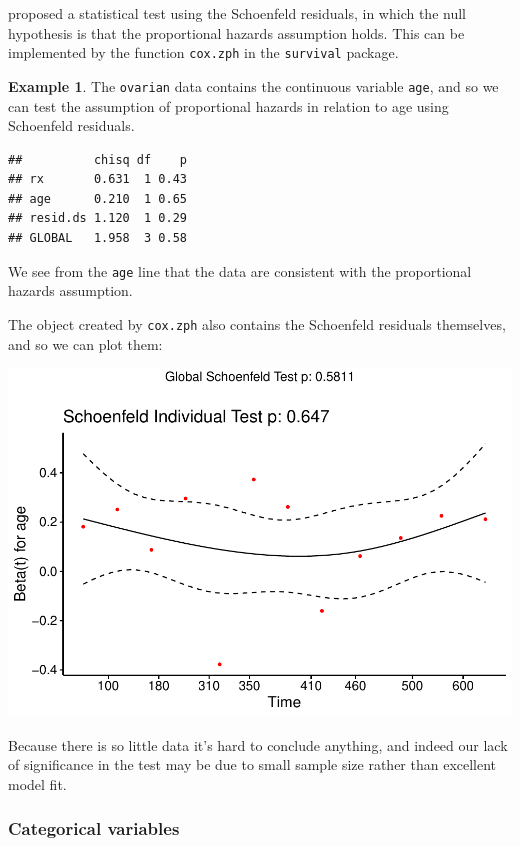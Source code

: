 \documentclass[
  openany]{book}
\theoremstyle{definition}
\theoremstyle{definition}
\newtheorem{example}{Example}[chapter]
\theoremstyle{definition}
\theoremstyle{definition}
\theoremstyle{remark}
\begin{document}
\citet{grambsch1994proportional} proposed a statistical test using the Schoenfeld residuals, in which the null hypothesis is that the proportional hazards assumption holds. This can be implemented by the function \texttt{cox.zph} in the \texttt{survival} package.

\begin{example}
The \texttt{ovarian} data contains the continuous variable \texttt{age}, and so we can test the assumption of proportional hazards in relation to age using Schoenfeld residuals.

\begin{verbatim}
##          chisq df    p
## rx       0.631  1 0.43
## age      0.210  1 0.65
## resid.ds 1.120  1 0.29
## GLOBAL   1.958  3 0.58
\end{verbatim}

We see from the \texttt{age} line that the data are consistent with the proportional hazards assumption.

The object created by \texttt{cox.zph} also contains the Schoenfeld residuals themselves, and so we can plot them:

\includegraphics{CT4H_notes_files/figure-latex/unnamed-chunk-63-1.pdf}

Because there is so little data it's hard to conclude anything, and indeed our lack of significance in the test may be due to small sample size rather than excellent model fit.
\end{example}

\subsubsection{Categorical variables}\label{categorical-variables}
\end{document}
